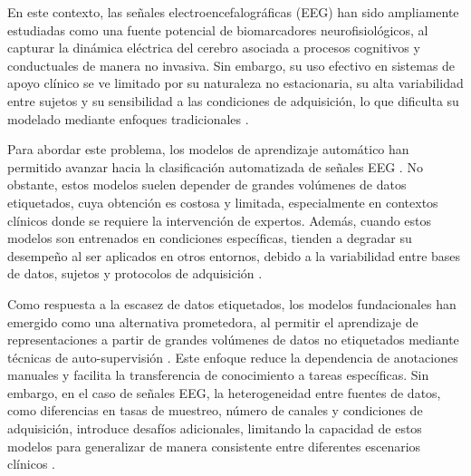 En este contexto, las señales electroencefalográficas (EEG) han sido ampliamente estudiadas como una fuente potencial de biomarcadores neurofisiológicos, al capturar la dinámica eléctrica del cerebro asociada a procesos cognitivos y conductuales de manera no invasiva. Sin embargo, su uso efectivo en sistemas de apoyo clínico se ve limitado por su naturaleza no estacionaria, su alta variabilidad entre sujetos y su sensibilidad a las condiciones de adquisición, lo que dificulta su modelado mediante enfoques tradicionales \cite{KHARE2023106676,Loh2024,10609514}. 

Para abordar este problema, los modelos de aprendizaje automático han permitido avanzar hacia la clasificación automatizada de señales EEG \cite{article}. No obstante, estos modelos suelen depender de grandes volúmenes de datos etiquetados, cuya obtención es costosa y limitada, especialmente en contextos clínicos donde se requiere la intervención de expertos. Además, cuando estos modelos son entrenados en condiciones específicas, tienden a degradar su desempeño al ser aplicados en otros entornos, debido a la variabilidad entre bases de datos, sujetos y protocolos de adquisición \cite{emam2021statedatacomputervision,healthcare11030285}. 

Como respuesta a la escasez de datos etiquetados, los modelos fundacionales han emergido como una alternativa prometedora, al permitir el aprendizaje de representaciones a partir de grandes volúmenes de datos no etiquetados mediante técnicas de auto-supervisión \cite{Mathew2024,Abbaspourazad2023}. Este enfoque reduce la dependencia de anotaciones manuales y facilita la transferencia de conocimiento a tareas específicas. Sin embargo, en el caso de señales EEG, la heterogeneidad entre fuentes de datos, como diferencias en tasas de muestreo, número de canales y condiciones de adquisición, introduce desafíos adicionales, limitando la capacidad de estos modelos para generalizar de manera consistente entre diferentes escenarios clínicos \cite{APICELLA2024128354}.

